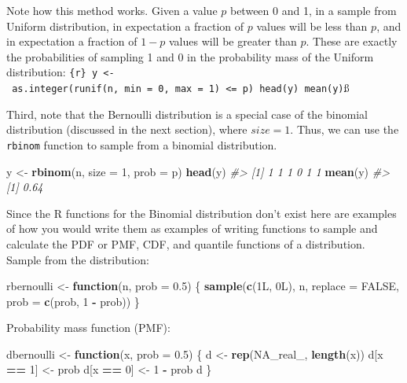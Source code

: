 \documentclass[]{book}
\newenvironment{Shaded}{\begin{snugshade}}{\end{snugshade}}
\newcommand{\KeywordTok}[1]{\textcolor[rgb]{0.13,0.29,0.53}{\textbf{#1}}}
\newcommand{\DataTypeTok}[1]{\textcolor[rgb]{0.13,0.29,0.53}{#1}}
\newcommand{\DecValTok}[1]{\textcolor[rgb]{0.00,0.00,0.81}{#1}}
\newcommand{\FloatTok}[1]{\textcolor[rgb]{0.00,0.00,0.81}{#1}}
\newcommand{\StringTok}[1]{\textcolor[rgb]{0.31,0.60,0.02}{#1}}
\newcommand{\CommentTok}[1]{\textcolor[rgb]{0.56,0.35,0.01}{\textit{#1}}}
\newcommand{\OtherTok}[1]{\textcolor[rgb]{0.56,0.35,0.01}{#1}}
\newcommand{\ControlFlowTok}[1]{\textcolor[rgb]{0.13,0.29,0.53}{\textbf{#1}}}
\newcommand{\OperatorTok}[1]{\textcolor[rgb]{0.81,0.36,0.00}{\textbf{#1}}}
\newcommand{\NormalTok}[1]{#1}
\theoremstyle{definition}
\theoremstyle{definition}
\theoremstyle{definition}
\theoremstyle{remark}
\begin{document}
Note how this method works. Given a value \(p\) between 0 and 1, in a
sample from Uniform distribution, in expectation a fraction of \(p\)
values will be less than \(p\), and in expectation a fraction of
\(1 - p\) values will be greater than \(p\). These are exactly the
probabilities of sampling 1 and 0 in the probability mass of the Uniform
distribution:
\texttt{\{r\}\ y\ \textless{}-\ as.integer(runif(n,\ min\ =\ 0,\ max\ =\ 1)\ \textless{}=\ p)\ head(y)\ mean(y)}ß

Third, note that the Bernoulli distribution is a special case of the
binomial distribution (discussed in the next section), where
\(size = 1\). Thus, we can use the \texttt{rbinom} function to sample
from a binomial distribution.

\begin{Shaded}
\begin{Highlighting}[]
\NormalTok{y <-}\StringTok{ }\KeywordTok{rbinom}\NormalTok{(n, }\DataTypeTok{size =} \DecValTok{1}\NormalTok{, }\DataTypeTok{prob =}\NormalTok{ p)}
\KeywordTok{head}\NormalTok{(y)}
\CommentTok{#> [1] 1 1 1 0 1 1}
\KeywordTok{mean}\NormalTok{(y)}
\CommentTok{#> [1] 0.64}
\end{Highlighting}
\end{Shaded}

Since the R functions for the Binomial distribution don't exist here are
examples of how you would write them as examples of writing functions to
sample and calculate the PDF or PMF, CDF, and quantile functions of a
distribution. Sample from the distribution:

\begin{Shaded}
\begin{Highlighting}[]
\NormalTok{rbernoulli <-}\StringTok{ }\ControlFlowTok{function}\NormalTok{(n, }\DataTypeTok{prob =} \FloatTok{0.5}\NormalTok{) \{}
  \KeywordTok{sample}\NormalTok{(}\KeywordTok{c}\NormalTok{(1L, 0L), n, }\DataTypeTok{replace =} \OtherTok{FALSE}\NormalTok{, }\DataTypeTok{prob =} \KeywordTok{c}\NormalTok{(prob, }\DecValTok{1} \OperatorTok{-}\StringTok{ }\NormalTok{prob))}
\NormalTok{\}}
\end{Highlighting}
\end{Shaded}

Probability mass function (PMF):

\begin{Shaded}
\begin{Highlighting}[]
\NormalTok{dbernoulli <-}\StringTok{ }\ControlFlowTok{function}\NormalTok{(x, }\DataTypeTok{prob =} \FloatTok{0.5}\NormalTok{) \{}
\NormalTok{  d <-}\StringTok{ }\KeywordTok{rep}\NormalTok{(}\OtherTok{NA_real_}\NormalTok{, }\KeywordTok{length}\NormalTok{(x))}
\NormalTok{  d[x }\OperatorTok{==}\StringTok{ }\DecValTok{1}\NormalTok{] <-}\StringTok{ }\NormalTok{prob}
\NormalTok{  d[x }\OperatorTok{==}\StringTok{ }\DecValTok{0}\NormalTok{] <-}\StringTok{ }\DecValTok{1} \OperatorTok{-}\StringTok{ }\NormalTok{prob}
\NormalTok{  d}
\NormalTok{\}}
\end{Highlighting}
\end{Shaded}
\end{document}
